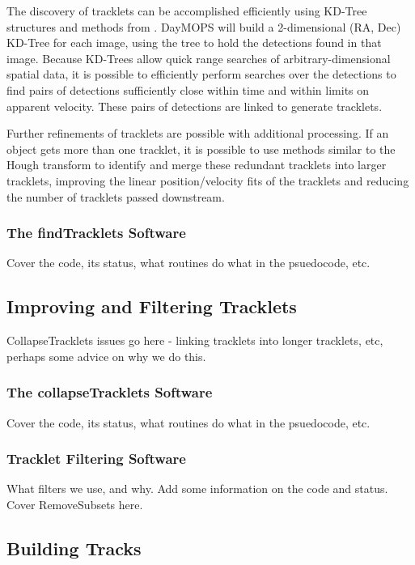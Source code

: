 \documentclass[12pt,preprint]{aastex}
\begin{document}
The discovery of tracklets can be accomplished efficiently using
KD-Tree structures \citep{bentley_kdtrees} and methods from
\citet{kubica_thesis}.  DayMOPS will build a 2-dimensional (RA, Dec)
KD-Tree for each image, using the tree to hold the detections found in
that image.  Because KD-Trees allow quick range searches of
arbitrary-dimensional spatial data, it is possible to efficiently
perform searches over the detections to find pairs of detections
sufficiently close within time and within limits on apparent
velocity. These pairs of detections are linked to generate tracklets.


Further refinements of tracklets are possible with additional
processing. If an object gets more than one tracklet, it is possible
to use methods similar to the Hough transform to identify and merge
these redundant tracklets into larger tracklets, improving the linear
position/velocity fits of the tracklets and reducing the number of
tracklets passed downstream.

\subsubsection{The findTracklets Software}
Cover the code, its status, what routines do what in the psuedocode, etc.

\subsection{Improving and Filtering Tracklets}
CollapseTracklets issues go here - linking tracklets into longer
tracklets, etc, perhaps some advice on why we do this.

\subsubsection{The collapseTracklets Software}
Cover the code, its status, what routines do what in the psuedocode, etc.

\subsubsection{Tracklet Filtering Software}
What filters we use, and why. Add some information on the code and
status.  Cover RemoveSubsets here.


\subsection{Building Tracks}
\end{document}
